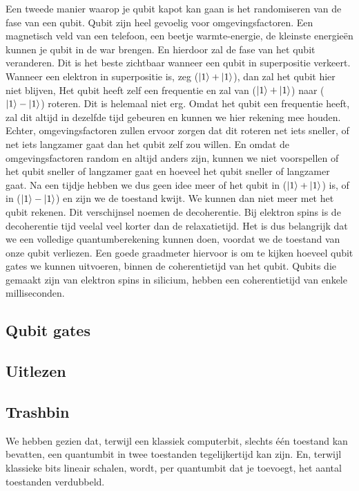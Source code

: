 \documentclass[../../main.tex]{subfiles}
\begin{document}
Een tweede manier waarop je qubit kapot kan gaan is het randomiseren van de fase van een qubit. Qubit zijn heel gevoelig voor omgevingsfactoren. Een magnetisch veld van een telefoon, een beetje warmte-energie, de kleinste energie\"en kunnen je qubit in de war brengen. En hierdoor zal de fase van het qubit veranderen. Dit is het beste zichtbaar wanneer een qubit in superpositie verkeert. Wanneer een elektron in superpositie is, zeg ($\ket{1}+\ket{1}$), dan zal het qubit hier niet blijven, Het qubit heeft zelf een frequentie en zal van ($\ket{1}+\ket{1}$) naar ($\ket{1}-\ket{1}$) roteren. Dit is helemaal niet erg. Omdat het qubit een frequentie heeft, zal dit altijd in dezelfde tijd gebeuren en kunnen we hier rekening mee houden. Echter, omgevingsfactoren zullen ervoor zorgen dat dit roteren net iets sneller, of net iets langzamer gaat dan het qubit zelf zou willen. En omdat de omgevingsfactoren random en altijd anders zijn, kunnen we niet voorspellen of het qubit sneller of langzamer gaat en hoeveel het qubit sneller of langzamer gaat. Na een tijdje hebben we dus geen idee meer of het qubit in ($\ket{1}+\ket{1}$) is, of in ($\ket{1}-\ket{1}$) en zijn we de toestand kwijt. We kunnen dan niet meer met het qubit rekenen. Dit verschijnsel noemen de decoherentie. Bij elektron spins is de decoherentie tijd veelal veel korter dan de relaxatietijd. Het is dus belangrijk dat we een volledige quantumberekening kunnen doen, voordat we de toestand van onze qubit verliezen. Een goede graadmeter hiervoor is om te kijken hoeveel qubit gates we kunnen uitvoeren, binnen de coherentietijd van het qubit. Qubits die gemaakt zijn van elektron spins in silicium, hebben een coherentietijd van enkele milliseconden. 

\iffalse%

\subsection{Qubit gates}


\subsection{Uitlezen\label{uitlezen}}





\subsection{Trashbin}
We hebben gezien dat, terwijl een klassiek computerbit, slechts \'e\'en toestand kan bevatten, een quantumbit in twee toestanden tegelijkertijd kan zijn.  En, terwijl klassieke bits lineair schalen, wordt, per quantumbit dat je toevoegt,  het aantal toestanden verdubbeld. 
\end{document}
